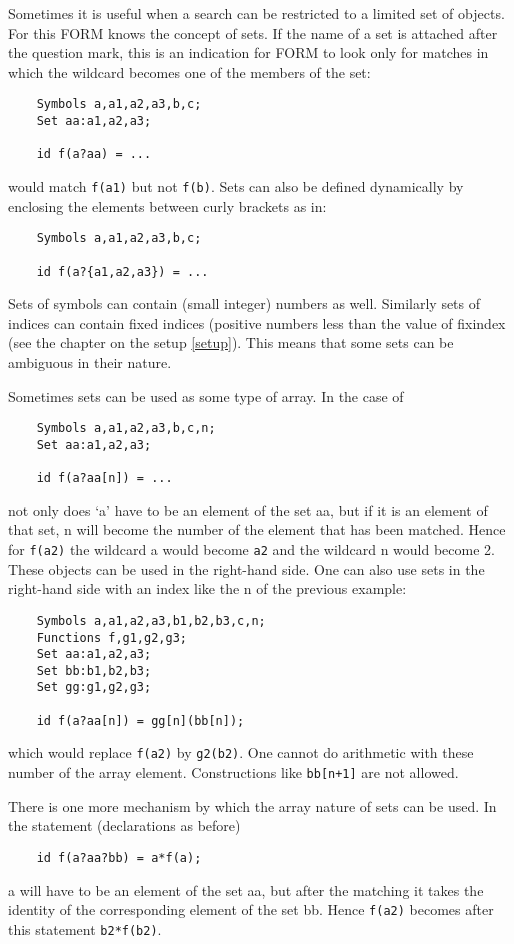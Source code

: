 Sometimes it is useful when a search can be restricted to a limited set of 
objects. For this FORM knows the concept of sets. If the name of 
a set is attached after the question mark, this is an indication for FORM 
to look only for matches in which the wildcard becomes one of the members 
of the set:
\begin{verbatim}
    Symbols a,a1,a2,a3,b,c;
    Set aa:a1,a2,a3;

    id f(a?aa) = ...
\end{verbatim}
would match \verb:f(a1): but not \verb:f(b):. Sets can also be defined 
dynamically by enclosing the elements between curly 
brackets as in:
\begin{verbatim}
    Symbols a,a1,a2,a3,b,c;

    id f(a?{a1,a2,a3}) = ...
\end{verbatim}
Sets of symbols can contain (small integer) numbers 
as well. Similarly sets of indices can contain fixed 
indices (positive numbers less than the value of fixindex 
(see the chapter on the setup \ref{setup}). This means that some sets can 
be ambiguous in their nature.

Sometimes sets can be used as some type of 
array. In the case of
\begin{verbatim}
    Symbols a,a1,a2,a3,b,c,n;
    Set aa:a1,a2,a3;

    id f(a?aa[n]) = ...
\end{verbatim}
not only does `a' have to be an element of the set aa, but if it is an 
element of that set, n will become the number of the element that has been 
matched. Hence for \verb:f(a2): the wildcard a would become \verb:a2: and 
the wildcard n would become 2. These objects can be used in the 
right-hand side. One can also use sets in the right-hand side with an index 
like the n of the previous example:
\begin{verbatim}
    Symbols a,a1,a2,a3,b1,b2,b3,c,n;
    Functions f,g1,g2,g3;
    Set aa:a1,a2,a3;
    Set bb:b1,b2,b3;
    Set gg:g1,g2,g3;

    id f(a?aa[n]) = gg[n](bb[n]);
\end{verbatim}
which would replace \verb:f(a2): by \verb:g2(b2):. One cannot do 
arithmetic with these number of the array element. 
Constructions like \verb:bb[n+1]: are not allowed.

There is one more mechanism by which the array nature of sets can be used. 
In the statement (declarations as before)
\begin{verbatim}
    id f(a?aa?bb) = a*f(a);
\end{verbatim}
a will have to be an element of the set aa, but after the matching it takes 
the identity of the corresponding element of 
the set bb. Hence \verb:f(a2): becomes after this statement 
\verb:b2*f(b2):.


